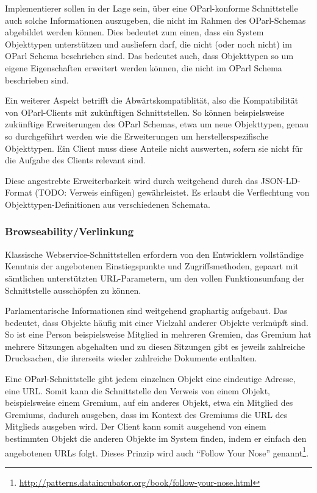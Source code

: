 \documentclass[,a4paper]{article}
\begin{document}

Implementierer sollen in der Lage sein, über eine OParl-konforme
Schnittstelle auch solche Informationen auszugeben, die nicht im Rahmen
des OParl-Schemas abgebildet werden können. Dies bedeutet zum einen,
dass ein System Objekttypen unterstützen und ausliefern darf, die nicht
(oder noch nicht) im OParl Schema beschrieben sind. Das bedeutet auch,
dass Objekttypen so um eigene Eigenschaften erweitert werden können, die
nicht im OParl Schema beschrieben sind.

Ein weiterer Aspekt betrifft die Abwärtskompatiblität, also die
Kompatibilität von OParl-Clients mit zukünftigen Schnittstellen. So
können beispielsweise zukünftige Erweiterungen des OParl Schemas, etwa
um neue Objekttypen, genau so durchgeführt werden wie die Erweiterungen
um herstellerspezifische Objekttypen. Ein Client muss diese Anteile
nicht auswerten, sofern sie nicht für die Aufgabe des Clients relevant
sind.

Diese angestrebte Erweiterbarkeit wird durch weitgehend durch das
JSON-LD-Format (TODO: Verweis einfügen) gewährleistet. Es erlaubt die
Verflechtung von Objekttypen-Definitionen aus verschiedenen Schemata.

\subsubsection{Browseability/Verlinkung}\label{browseabilityverlinkung}

Klassische Webservice-Schnittstellen erfordern von den Entwicklern
vollständige Kenntnis der angebotenen Einstiegspunkte und
Zugriffsmethoden, gepaart mit sämtlichen unterstützten URL-Parametern,
um den vollen Funktionsumfang der Schnittstelle ausschöpfen zu können.

Parlamentarische Informationen sind weitgehend graphartig aufgebaut. Das
bedeutet, dass Objekte häufig mit einer Vielzahl anderer Objekte
verknüpft sind. So ist eine Person beispielsweise Mitglied in mehreren
Gremien, das Gremium hat mehrere Sitzungen abgehalten und zu diesen
Sitzungen gibt es jeweils zahlreiche Drucksachen, die ihrerseits wieder
zahlreiche Dokumente enthalten.

Eine OParl-Schnittstelle gibt jedem einzelnen Objekt eine eindeutige
Adresse, eine URL. Somit kann die Schnittstelle den Verweis von einem
Objekt, beispielsweise einem Gremium, auf ein anderes Objekt, etwa ein
Mitglied des Gremiums, dadurch ausgeben, dass im Kontext des Gremiums
die URL des Mitglieds ausgeben wird. Der Client kann somit ausgehend von
einem bestimmten Objekt die anderen Objekte im System finden, indem er
einfach den angebotenen URLs folgt. Dieses Prinzip wird auch ``Follow
Your Nose'' genannt\footnote{\url{http://patterns.dataincubator.org/book/follow-your-nose.html}}.
\end{document}
